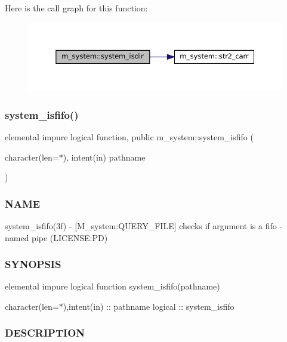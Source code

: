 Here is the call graph for this function\+:\nopagebreak
\begin{figure}[H]
\begin{center}
\leavevmode
\includegraphics[width=350pt]{namespacem__system_a7946ea976f399baff21caebcbe931f6d_cgraph}
\end{center}
\end{figure}
\mbox{\label{namespacem__system_aa2bdb5f75405d87934c10756b539d082}} 
\subsubsection{\texorpdfstring{system\+\_\+isfifo()}{system\_isfifo()}}
{\footnotesize\ttfamily elemental impure logical function, public m\+\_\+system\+::system\+\_\+isfifo (\begin{DoxyParamCaption}\item[{character(len=$\ast$), intent(in)}]{pathname }\end{DoxyParamCaption})}



\subsubsection*{N\+A\+ME}

system\+\_\+isfifo(3f) -\/ \mbox{[}M\+\_\+system\+:Q\+U\+E\+R\+Y\+\_\+\+F\+I\+LE\mbox{]} checks if argument is a fifo -\/ named pipe (L\+I\+C\+E\+N\+SE\+:PD) 

\subsubsection*{S\+Y\+N\+O\+P\+S\+IS}

elemental impure logical function system\+\_\+isfifo(pathname)

character(len=$\ast$),intent(in) \+:\+: pathname logical \+:\+: system\+\_\+isfifo

\subsubsection*{D\+E\+S\+C\+R\+I\+P\+T\+I\+ON}

